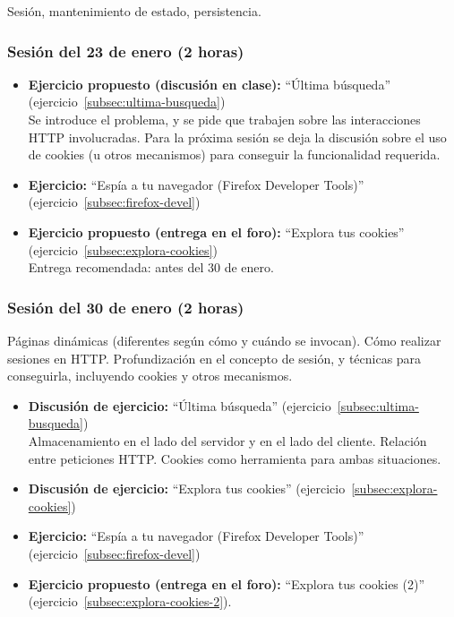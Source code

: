 \documentclass[a4paper,12pt]{article}
\begin{document}
Sesión, mantenimiento de estado, persistencia.

\subsubsection{Sesión del 23 de enero (2 horas)}

\begin{itemize}
\item \textbf{Ejercicio propuesto (discusión en clase):} ``Última búsqueda'' (ejercicio~\ref{subsec:ultima-busqueda}) \\
  Se introduce el problema, y se pide que trabajen sobre las interacciones HTTP involucradas. Para la próxima sesión se deja la discusión sobre el uso de cookies (u otros mecanismos) para conseguir la funcionalidad requerida.
\item \textbf{Ejercicio:} ``Espía a tu navegador (Firefox Developer Tools)'' (ejercicio~\ref{subsec:firefox-devel})
\item \textbf{Ejercicio propuesto (entrega en el foro):} ``Explora tus cookies'' (ejercicio~\ref{subsec:explora-cookies}) \\
  Entrega recomendada: antes del 30 de enero.
\end{itemize}

\subsubsection{Sesión del 30 de enero (2 horas)}

Páginas dinámicas (diferentes según cómo y cuándo se invocan). Cómo realizar sesiones en HTTP. Profundización en el concepto de sesión, y técnicas para conseguirla, incluyendo cookies y otros mecanismos.

\begin{itemize}
\item \textbf{Discusión de ejercicio:} ``Última búsqueda'' (ejercicio~\ref{subsec:ultima-busqueda}) \\
  Almacenamiento en el lado del servidor y en el lado del cliente. Relación entre peticiones HTTP. Cookies como herramienta para ambas situaciones.
\item \textbf{Discusión de ejercicio:} ``Explora tus cookies'' (ejercicio~\ref{subsec:explora-cookies})
\item \textbf{Ejercicio:} ``Espía a tu navegador (Firefox Developer Tools)'' (ejercicio~\ref{subsec:firefox-devel})
\item \textbf{Ejercicio propuesto (entrega en el foro):} ``Explora tus cookies (2)'' (ejercicio~\ref{subsec:explora-cookies-2}).
\end{itemize}
\end{document}
